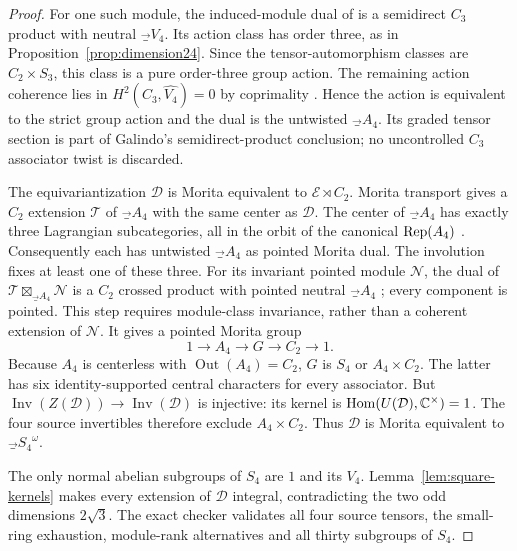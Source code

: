 \begin{proof}
For one such module, the induced-module dual of
\cite[Theorem~1.3]{GalindoClifford} is a semidirect $C_3$ product
with neutral $\Vec_{V_4}$. Its action class has order three, as in
Proposition~\ref{prop:dimension24}.
Since the tensor-automorphism classes are $C_2\times S_3$, this
class is a pure order-three group action. The remaining action
coherence lies in $H^2(C_3,\widehat{V_4})=0$ by coprimality
\cite[Proposition~3.2]{NikshychRiepel}. Hence the action is equivalent
to the strict group action and the dual is the untwisted
$\Vec_{A_4}$. Its graded tensor section is part of Galindo's
semidirect-product conclusion; no uncontrolled $C_3$ associator
twist is discarded.

The equivariantization $\mathcal D$ is Morita equivalent to
$\mathcal E\rtimes C_2$. Morita transport gives a $C_2$ extension
$\mathcal T$ of $\Vec_{A_4}$ with the same center as $\mathcal D$.
The center of $\Vec_{A_4}$ has exactly three Lagrangian subcategories,
all in the orbit of the canonical $\operatorname{Rep}(A_4)$
\cite[Proposition~7.6 and Section~8.3]{NikshychRiepel}.
Consequently each has untwisted $\Vec_{A_4}$ as pointed Morita dual.
The involution fixes at least one of these three. For its invariant
pointed module $\mathcal N$, the dual of
$\mathcal T\boxtimes_{\Vec_{A_4}}\mathcal N$ is a $C_2$ crossed
product with pointed neutral $\Vec_{A_4}$
\cite[Proposition~5.3]{GalindoClifford}; every component is pointed.
This step requires module-class invariance, rather than a coherent
extension of $\mathcal N$. It gives a pointed Morita group
\[
1\longrightarrow A_4\longrightarrow G\longrightarrow C_2
\longrightarrow1.
\]
Because $A_4$ is centerless with $\operatorname{Out}(A_4)=C_2$,
$G$ is $S_4$ or $A_4\times C_2$.
The latter has six identity-supported central characters for every
associator. But
$\operatorname{Inv}(Z(\mathcal D))\to\operatorname{Inv}(\mathcal D)$
is injective: its kernel is
$\operatorname{Hom}(U(\mathcal D),\mathbb C^\times)=1$.
The four source invertibles therefore exclude $A_4\times C_2$.
Thus $\mathcal D$ is Morita equivalent to $\Vec_{S_4}^\omega$.

The only normal abelian subgroups of $S_4$ are $1$ and its $V_4$.
Lemma~\ref{lem:square-kernels} makes every extension of
$\mathcal D$ integral, contradicting the two odd dimensions
$2\sqrt3$. The exact checker validates all four source tensors,
the small-ring exhaustion, module-rank alternatives and all thirty
subgroups of $S_4$.
\end{proof}

